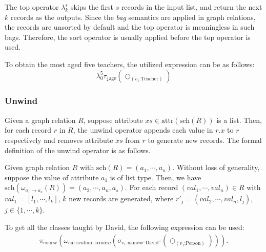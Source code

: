 The top operator $\lambda_k^s$ skips the first $s$ records in the input list, and return the next $k$ records as the outputs.
Since the \emph{bag} semantics are applied in graph relations, the records are unsorted by default and the top operator is meaningless in such bags.
Therefore, the sort operator is usually applied before the top operator is used.

\begin{example}
    To obtain the most aged five teachers, the utilized expression can be as follows:
    \begin{equation*}
        \lambda_{0}^{5}\tau_{\downarrow \text{age}}(\bigcirc_{(v_1\text{:Teacher})})
    \end{equation*}
\end{example}


\subsubsection{Unwind}

Given a graph relation $R$, suppose attribute $xs \in \text{attr}(\text{sch}(R))$ is a list.
Then, for each record $r$ in $R$, the unwind operator appends each value in $r.x$ to $r$ respectively and removes attribute $xs$ from $r$ to generate new records.
The formal definition of the unwind operator is as follows.

\begin{definition}
    Given graph relation $R$ with $\text{sch}(R) = (a_1, \cdots, a_n)$.
    Without loss of generality, suppose the value of attribute $a_1$ is of list type.
    Then, we have $\text{sch}(\omega_{a_1 \rightarrow a_s}(R)) = (a_2, \cdots, a_n, a_s)$.
    For each record $(val_1, \cdots, val_n) \in R$ with $val_1 = [l_1, \cdots, l_k]$,  $k$ new records are generated, where $r'_j = (val_2, \cdots, val_n, l_j)$, $j \in \{1, \cdots, k\}$.
\end{definition}

\begin{example}
    To get all the classes taught by David, the following expression can be used:
    \begin{equation*}
        \begin{split}
            \pi_{\text{course}}(\omega_{\text{curriculum} \rightarrow \text{course}}(\sigma_{v_1\text{.name=``David''}}(\bigcirc_{(v_1\text{:Person})}))).
        \end{split}
    \end{equation*}
\end{example}

